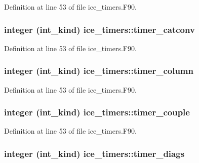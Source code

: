 Definition at line 53 of file ice\_\-timers.F90.\hypertarget{namespaceice__timers_ab82172beab2bd8755db6ebcfe7ae5f35}{
\subsubsection[{timer\_\-catconv}]{\setlength{\rightskip}{0pt plus 5cm}integer (int\_\-kind) {\bf ice\_\-timers::timer\_\-catconv}}}
\label{namespaceice__timers_ab82172beab2bd8755db6ebcfe7ae5f35}


Definition at line 53 of file ice\_\-timers.F90.\hypertarget{namespaceice__timers_ab9384dde0a037de0babca404c47d3084}{
\subsubsection[{timer\_\-column}]{\setlength{\rightskip}{0pt plus 5cm}integer (int\_\-kind) {\bf ice\_\-timers::timer\_\-column}}}
\label{namespaceice__timers_ab9384dde0a037de0babca404c47d3084}


Definition at line 53 of file ice\_\-timers.F90.\hypertarget{namespaceice__timers_a08bc2ebb9f8789a162d1f1ee3df678a2}{
\subsubsection[{timer\_\-couple}]{\setlength{\rightskip}{0pt plus 5cm}integer (int\_\-kind) {\bf ice\_\-timers::timer\_\-couple}}}
\label{namespaceice__timers_a08bc2ebb9f8789a162d1f1ee3df678a2}


Definition at line 53 of file ice\_\-timers.F90.\hypertarget{namespaceice__timers_a6b3fa397674377c5596ab9a0a4e1beb2}{
\subsubsection[{timer\_\-diags}]{\setlength{\rightskip}{0pt plus 5cm}integer (int\_\-kind) {\bf ice\_\-timers::timer\_\-diags}}}
\label{namespaceice__timers_a6b3fa397674377c5596ab9a0a4e1beb2}


